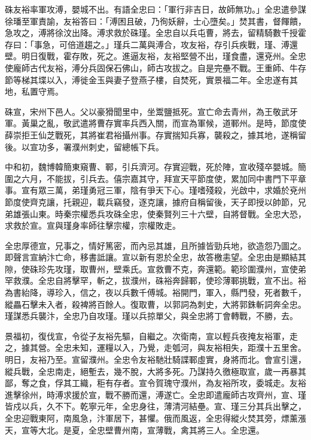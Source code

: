\begin{pinyinscope}
 硃友裕率軍攻溥，嬰城不出。有語全忠曰：「軍行非吉日，故師無功。」全忠遣參謀徐璠至軍責諭，友裕答曰：「溥困且破，乃徇妖辭，士心墮矣。」焚其書，督餫饋，急攻之，溥將徐汶出降。溥求救於硃瑾。全忠自以兵屯曹，將去，留精騎數千授霍存曰：「事急，可倍道趨之。」瑾兵二萬與溥合，攻友裕，存引兵疾戰，瑾、溥還壁。明日復戰，霍存敗，死之。進逼友裕，友裕堅營不出，瑾食盡，還兗州。全忠使龐師古代友裕，溥分兵固保石佛山，師古攻拔之。自是完壘不戰。王重師、牛存節等梯其堞以入，溥徙金玉與妻子登燕子樓，自焚死，實景福二年。全忠遂有其地，私置守焉。



 硃宣，宋州下邑人。父以豪猾聞里中，坐鬻鹽抵死。宣亡命去青州，為王敬武牙軍。黃巢之亂，敬武遣將曹存實率兵西入關，而宣為軍候，道鄆州。是時，節度使薛崇拒王仙芝戰死，其將崔君裕攝州事。存實揣知兵寡，襲殺之，據其地，遂稱留後。以宣功多，署濮州刺史，留總帳下兵。



 中和初，魏博韓簡東窺曹、鄆，引兵濟河。存實迎戰，死於陣，宣收殘卒嬰城。簡圍之六月，不能拔，引兵去。僖宗嘉其守，拜宣天平節度使，累加同中書門下平章事。宣有眾三萬，弟瑾勇冠三軍，陰有爭天下心。瑾嗜殘殺，光啟中，求婚於兗州節度使齊克讓，托親迎，載兵竊發，逐克讓，據府自稱留後，天子即授以帥節，兄弟雄張山東。時秦宗權悉兵攻硃全忠，使秦賢列三十六壁，自將督戰。全忠大恐，求救於宣。宣與瑾身率師往擊宗權，宗權敗走。



 全忠厚德宣，兄事之，情好篤密，而內忌其雄，且所據皆勁兵地，欲造怨乃圖之。即聲言宣納汴亡命，移書詆讓。宣以新有恩於全忠，故答檄恚望。全忠由是顯結其隙，使硃珍先攻瑾，取曹州，壁乘氏。宣救曹不克，奔還範。範珍圍濮州，宣使弟罕救濮。全忠自將擊罕，斬之，拔濮州，硃裕奔歸鄆，使珍薄鄆挑戰，宣不出。裕為書紿降，導珍入，信之，夜以兵數千傅城。裕開門，軍入，縣門發，死者數千，縱畾石擊未入者，殺裨將百餘人。復取曹，以郭詞為刺史，大將郭銖斬詞奔全忠。瑾謀悉兵襲汴，全忠乃自攻瑾。瑾以兵掠單父，與全忠將丁會轉戰，不勝，去。



 景福初，復伐宣，令從子友裕先驅，自繼之。次衛南，宣以輕兵夜掩友裕軍，走之，據其營。全忠未知，運糧以入，乃覺，走瓠河，與友裕相失，距濮十五里舍。明日，友裕乃至。宣留濮州。全忠令友裕馳壯騎諜鄆虛實，身將而北。會宣引還，縱兵戰，全忠南走，絕塹去，幾不脫，大將多死。乃謀持久徼極取宣，歲一再暴其鄙，奪之食，俘其工織，秬有存者。宣令賀瑰守濮州，為友裕所攻，委城走。友裕進擊徐州，時溥求援於宣，戰不勝而還，溥遂亡。全忠即遣龐師古攻齊州，宣、瑾皆戍以兵，久不下。乾寧元年，全忠身往，薄清河結壘。宣、瑾三分其兵出擊之，全忠迎戰東阿，南風急，汴軍居下，甚懼。俄而風返，全忠得縱火焚其旁，熛薰漲天，宣等大北。是夏，全忠壁曹州南，宣薄戰，禽其將三人。全忠還。




\end{pinyinscope}
